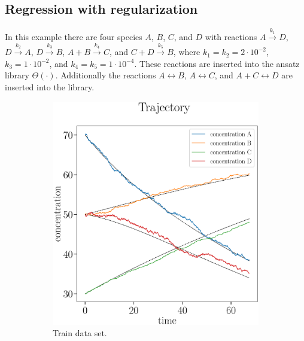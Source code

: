 \documentclass[oneside, abstracton, titlepage]{scrartcl}
\begin{document}
	\subsection{Regression with regularization}
	\label{sec:ex2}
	In this example there are four species $A$, $B$, $C$, and $D$ with reactions $A\xrightarrow{k_1}D$, $D\xrightarrow{k_2}A$, $D\xrightarrow{k_3}B$, $A+B\xrightarrow{k_4}C$, and $C+D\xrightarrow{k_5}B$, where $k_1=k_2=2\cdot 10^{-2}$, $k_3 = 1\cdot 10^{-2}$, and $k_4=k_5=1\cdot 10^{-4}$. These reactions are inserted into the ansatz library $\Theta (\cdot)$. Additionally the reactions $A\leftrightarrow B$, $A\leftrightarrow C$, and $A+C\leftrightarrow D$ are inserted into the library. 
	
	\begin{figure}
		\centering
		\begin{subfigure}[b]{.45\textwidth}
			\includegraphics[width=\textwidth]{./figures_tex/cv_concentrations_train}
			\caption{Train data set.}
		\end{subfigure}
		~
		\begin{subfigure}[b]{.45\textwidth}

\end{subfigure}
\end{figure}
\end{document}
